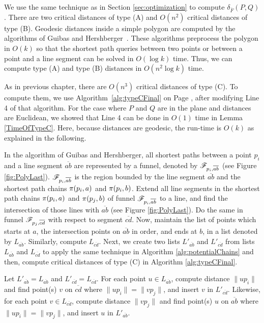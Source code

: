 \documentclass[12pt]{dalthesis}
\def\favoritefont{\bfseries \sffamily}
\def\QED{\ensuremath{{\Box}}}
\def\markatright#1{\leavevmode\unskip\nobreak\quad\hspace*{\fill}{#1}}
\newenvironment{proof}
	{\begin{trivlist}\item[\hskip\labelsep{\favoritefont Proof:}]}
	{\markatright{\QED}\end{trivlist}}
\newcommand{\CF}{{\mathscr F}}
\newcommand{\distFS}{\delta_{\bar{F}}} \newcommand{\distWeakF}{\delta_{\bar{N}}} \newcommand{\distClosedF}{\delta_{\bar{C}}} \newcommand{\distPartialF}{\delta_{\bar{P}}} \newcommand{\distGrpahF}{\delta_{\bar{G}}} \newcommand{\distDisF}{\delta_{dF}} \newcommand{\distGeoF}{\delta_{\hat{F}}} \newcommand{\distHomF}{\delta_{h}} \newcommand{\distC}{\delta_C} \newcommand{\distSetF}{\delta_{\CF}}
\newcommand{\Seg}[1]{{\overline{#1}}}
\begin{document}
\begin{proof}
We use the same technique as in Section  \ref{sec:optimization}
to compute $\distFS(P,Q)$.
There are two critical distances of type (A) and 
$O(n^2)$ critical distances of type (B).
Geodesic distances inside a simple polygon 
are computed by the algorithms of Guibas and 
Hershberger~\cite{Guibas86, Hershberger91}.
These algorithms preprocess the polygon in $O(k)$
so that 
the shortest path queries between two points  or
between a point and a line segment 
can be solved in $O(\log k)$ time. 
Thus, we can compute type (A) and type (B) distances 
in $O(n^2 \log k)$ time. 




As in previous chapter, 
there are $O(n^3)$ critical distances of type (C). 
To compute them, we use Algorithm~\ref{alg:typeCFinal} on Page
\pageref{alg:typeCFinal}, 
after modifying Line 4 of that algorithm.
For the case where $P$ and $Q$ are in the plane
and distances are Euclidean, we showed 
that Line 4 can be done in $O(1)$ time in Lemma \ref{TimeOfTypeC}. 
Here, because distances are geodesic, the 
run-time is $O(k)$ as explained in the following. 

In the algorithm of Guibas and 
Hershberger, all shortest paths between a point $p_i$ and a line segment $\Seg{ab}$ are represented by a funnel, denoted by  $\Funn_{p_i,\Seg{ab}}$
(see Figure \ref{fig:PolyLast}). $\Funn_{p_i,\Seg{ab}}$
is the region bounded by the line segment $\Seg{ab}$
and the shortest path chains $\pi(p_i,a)$ and 
$\pi(p_i,b)$. 
Extend all line segments in the shortest path 
chains $\pi(p_i,a)$ and $\pi(p_j,b)$ of funnel $\Funn_{p_i,\Seg{ab}}$
to a line, and find the intersection of those lines with 
$\Seg{ab}$ (see Figure \ref{fig:PolyLast}). Do the same in funnel $\Funn_{p_j,\Seg{cd}}$ with 
respect to segment $\Seg{cd}$. Now, maintain
the list of points which starts at 
$a$,  the intersection points on $\Seg{ab}$ in order, 
and ends at $b$, 
in a list denoted by  $L_{\Seg{ab}}$. Similarly, compute $L_{\Seg{cd}}$.
Next, we create 
two lists $L'_{\Seg{ab}}$ and $L'_{\Seg{cd}}$ from lists $L_{\Seg{ab}}$ and $L_{\Seg{cd}}$ to apply 
the same technique in Algorithm \ref{alg:potentialChains} and then, compute
critical distances of type (C)  in Algorithm \ref{alg:typeCFinal}.

Let $L'_{\Seg{ab}} = L_{\Seg{ab}}$ and 
$L'_{\Seg{cd}} = L_{\Seg{cd}}$. 
For each point $u \in L_{\Seg{ab}}$, 
compute distance $\| up_i\|$ and
find point(s) $v$ on $\Seg{cd}$ where
$\| up_i\| = \| vp_j\|$, and insert $v$ in $L'_{\Seg{cd}}$. 
Likewise, 
for each point $v \in L_{\Seg{cd}}$, 
compute distance $\| vp_j\|$ and
find point(s) $u$ on $\Seg{ab}$ where
$\| up_i\| = \| vp_j\|$, and insert $u$ in $L'_{\Seg{ab}}$.


\end{proof}
\end{document}
